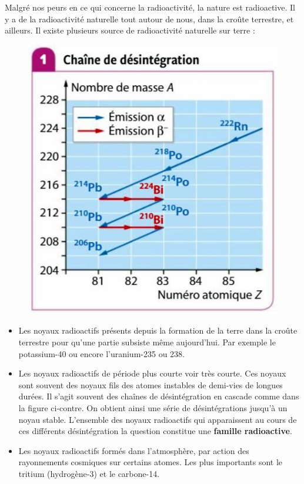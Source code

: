 \documentclass[11pt,a4paper]{article}
\begin{document}
Malgré nos peurs en ce qui concerne la radioactivité, la nature est radioactive. Il y a de la radioactivité naturelle tout autour de nous, dans la croûte terrestre, et ailleurs. Il existe plusieurs source de radioactivité naturelle sur terre : 
\begingroup
\begin{figure}
\centering
\includegraphics[width=0.95\linewidth]{imgs/p8/chainedesinteg.jpg}
\end{figure}
\begin{itemize}
    \item Les noyaux radioactifs présents depuis la formation de la terre dans la croûte terrestre pour qu'une partie subsiste même aujourd'hui. Par exemple le potassium-40 ou encore l'uranium-235 ou 238.
    \item Les noyaux radioactifs de période plus courte voir très courte. Ces noyaux sont souvent des noyaux fils des atomes instables de demi-vies de longues durées.  Il s'agit souvent des chaînes de désintégration en cascade comme dans la figure ci-contre. On obtient ainsi une série de désintégrations jusqu'à un noyau stable. L'ensemble des noyaux radioactifs qui apparaissent au cours de ces différents désintégration la question constitue une \textbf{famille radioactive}.
    \item Les noyaux radioactifs formés dans l'atmosphère, par action des rayonnements cosmiques sur certains atomes. Les plus importants sont le tritium (hydrogène-3) et le carbone-14.
\end{itemize}
\endgroup
\end{document}

